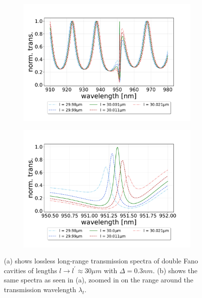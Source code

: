 \begin{figure}[h!]
    \centering
    \begin{subfigure}[b]{0.49\textwidth}
        \includegraphics[width=\textwidth]{figures/medium_detuning_length_scan_long.pdf}
        \caption{}
        \label{fig:detuned_length_scan_long}
    \end{subfigure}
    \begin{subfigure}[b]{0.49\textwidth}
        \includegraphics[width=\textwidth]{figures/medium_detuning_length_scan_short.pdf}
        \caption{}
        \label{fig:detuned_length_scan_short}
    \end{subfigure}
    \caption{(a) shows lossless long-range transmission spectra of double Fano cavities of lengths $l \rightarrow l^{\prime} \approx 30 \mu m$ with $\Delta = 0.3nm$. (b) shows the same spectra as seen in (a), zoomed in on the range around the transmission wavelength $\lambda_t$.}
    \label{fig:mid_detuning_length_scans}
\end{figure}

